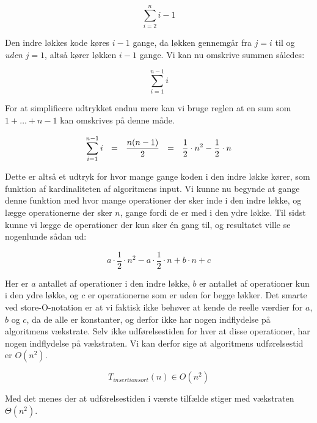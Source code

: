 $$\sum_{i=2}^{n}i-1$$

Den indre løkkes kode køres $i-1$ gange, da løkken gennemgår fra $j=i$ til og \emph{uden} $j=1$, altså kører løkken $i-1$ gange. Vi kan nu omskrive summen således:

$$\sum_{i=1}^{n-1}i$$

For at simplificere udtrykket endnu mere kan vi bruge reglen at en sum som $1 + \dots + n -1$ kan omskrives på denne måde. \red{[Bevis??]}

$$\sum_{i=1}^{n-1}i \:\:\:=\:\:\: \frac{n(n-1)}{2} \:\:\:=\:\:\: \frac{1}{2}\cdot  n^2 - \frac{1}{2}\cdot  n$$

Dette er altså et udtryk for hvor mange gange koden i den indre løkke kører, som funktion af kardinaliteten af algoritmens input. Vi kunne nu begynde at gange denne funktion med hvor mange operationer der sker inde i den indre løkke, og lægge operationerne der sker $n$, gange fordi de er med i den ydre løkke. Til sidst kunne vi lægge de operationer der kun sker én gang til, og resultatet ville se nogenlunde sådan ud:

$$a \cdot \frac{1}{2} \cdot n^2 - a \cdot \frac{1}{2} \cdot n + b \cdot n + c$$

Her er $a$ antallet af operationer i den indre løkke, $b$ er antallet af operationer kun i den ydre løkke, og $c$ er operationerne som er uden for begge løkker. Det smarte ved store-O-notation er at vi faktisk ikke behøver at kende de reelle værdier for $a$, $b$ og $c$, da de alle er konstanter, og derfor ikke har nogen indflydelse på algoritmens vækstrate. Selv ikke udførelsestiden for hver at disse operationer, har nogen indflydelse på vækstraten. Vi kan derfor sige at algoritmens udførelsestid er $O(n^2)$.

$$T_{insertionsort}(n) \in O(n^2)$$

Med det menes der at udførelsestiden i værste tilfælde stiger med vækstraten $\Theta (n^2)$.


